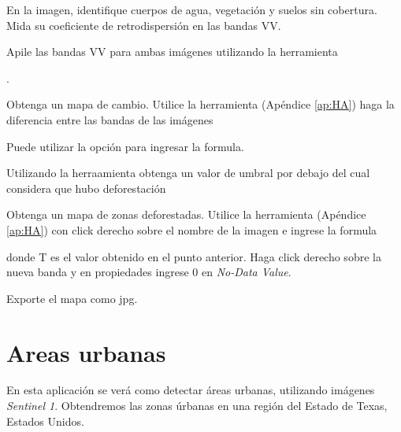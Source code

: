\begin{que}
    En la imagen, identifique cuerpos de agua, vegetación y suelos sin cobertura. Mida su coeficiente de retrodispersión en las bandas VV.
\end{que}

\begin{que}
  Apile las bandas VV para ambas imágenes utilizando la herramienta 
  \begin{center}
    .      
  \end{center}
  
\end{que}

\begin{que}
    Obtenga un mapa de cambio. Utilice la herramienta  (Apéndice \ref{ap:HA}) haga la diferencia entre las bandas de las imágenes
    \begin{center}
    \end{center}
    Puede utilizar la opción  para ingresar la formula.
\end{que}

\begin{que}
    Utilizando la herraamienta  obtenga un valor de umbral por debajo del cual considera que hubo deforestación
\end{que}

\begin{que}
    Obtenga un mapa de zonas deforestadas. Utilice la herramienta  (Apéndice \ref{ap:HA}) con click derecho sobre el nombre de la imagen e ingrese la formula
    \begin{center}
    \end{center}
    donde T es el valor obtenido en el punto anterior. Haga click derecho sobre la nueva banda y en propiedades ingrese 0 en \emph{No-Data Value}.
\end{que}

\begin{que}
    Exporte el mapa como jpg.
\end{que}


\section{Areas urbanas}

En esta aplicación se verá como detectar áreas urbanas, utilizando imágenes \emph{Sentinel 1}. Obtendremos las zonas úrbanas en una región del Estado de Texas, Estados Unidos.

